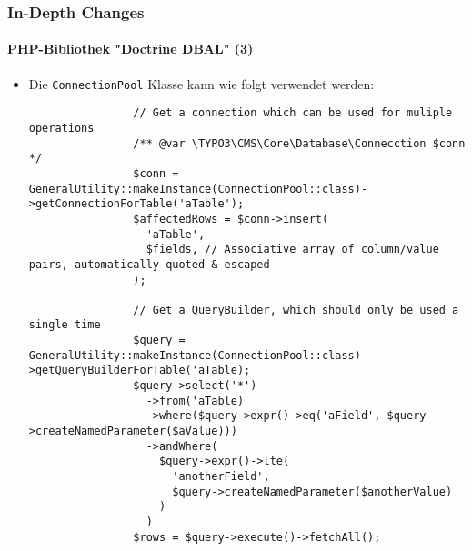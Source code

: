 \begin{frame}[fragile]
	\frametitle{In-Depth Changes}
	\framesubtitle{PHP-Bibliothek "Doctrine DBAL" (3)}

	\lstset{basicstyle=\tiny\ttfamily}

	\begin{itemize}

		\item Die \texttt{ConnectionPool} Klasse kann wie folgt verwendet werden:
			\begin{lstlisting}
				// Get a connection which can be used for muliple operations
				/** @var \TYPO3\CMS\Core\Database\Connecction $conn */
				$conn = GeneralUtility::makeInstance(ConnectionPool::class)->getConnectionForTable('aTable');
				$affectedRows = $conn->insert(
				  'aTable',
				  $fields, // Associative array of column/value pairs, automatically quoted & escaped
				);

				// Get a QueryBuilder, which should only be used a single time
				$query = GeneralUtility::makeInstance(ConnectionPool::class)->getQueryBuilderForTable('aTable);
				$query->select('*')
				  ->from('aTable)
				  ->where($query->expr()->eq('aField', $query->createNamedParameter($aValue)))
				  ->andWhere(
					$query->expr()->lte(
					  'anotherField',
					  $query->createNamedParameter($anotherValue)
					)
				  )
				$rows = $query->execute()->fetchAll();
			\end{lstlisting}
	\end{itemize}

\end{frame}

